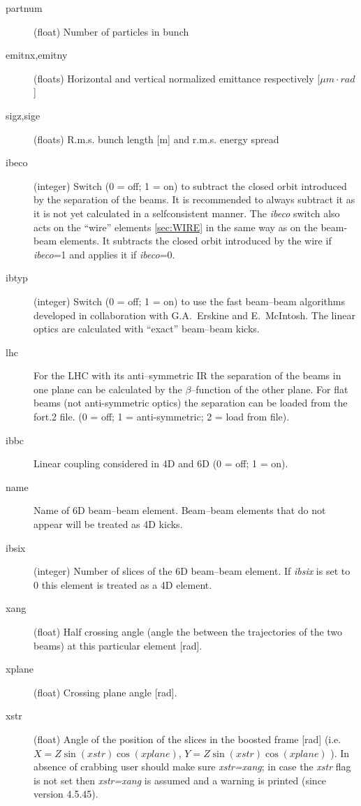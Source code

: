 \documentclass[a4paper,11pt]{report}
\begin{document}
\begin{description}
\item [partnum] (float) Number of particles in bunch
\item [emitnx,emitny] (floats) Horizontal and vertical normalized
  emittance respectively [$\mu m\cdot rad$]
\item [sigz,sige] (floats) R.m.s. bunch length [m] and r.m.s. energy
  spread
\item [ibeco] (integer) Switch (0 = off; 1 = on) to subtract the
  closed orbit introduced by the separation of the beams. It is
  recommended to always subtract it as it is not yet calculated in a
  selfconsistent manner. The \emph{ibeco} switch also acts on the ``wire'' elements \ref{sec:WIRE} in the same way as on the beam-beam elements. It subtracts the closed orbit introduced by the wire if \emph{ibeco}=1 and applies it if \emph{ibeco}=0.
\item [ibtyp] (integer) Switch (0 = off; 1 = on) to use the fast
  beam--beam algorithms developed in collaboration with G.A.~Erskine
  and E.~McIntosh.  The linear optics are calculated with ``exact''
  beam--beam kicks.
\item [lhc] For the LHC with its anti--symmetric IR the separation of
  the beams in one plane can be calculated by the $\beta$--function of
  the other plane. For flat beams (not anti-symmetric optics) the separation
  can be loaded from the fort.2 file. (0 = off; 1 = anti-symmetric; 2 = load from file).
\item [ibbc] Linear coupling considered in 4D and 6D (0 = off; 1 = on).
\item [name] Name of 6D beam--beam element. Beam--beam elements that
  do not appear will be treated as 4D kicks.
\item [ibsix] (integer) Number of slices of the 6D beam--beam element.
  If {\it ibsix} is set to 0 this element is treated as a 4D element.
\item [xang] (float) Half crossing angle (angle the between the trajectories of the two beams) at this particular element [rad].
\item [xplane] (float) Crossing plane angle [rad].
\item [xstr] (float) Angle of the position of the slices in the boosted frame [rad] (i.e. $X = Z \sin(\mathit{xstr}) \cos(\mathit{xplane})$, $Y =Z \sin(\mathit{xstr}) \cos(\mathit{xplane})$ ).
  In absence of crabbing user should make sure \textit{xstr=xang}; in case the \textit{xstr} flag is not set then \textit{xstr=xang} is assumed and a warning is printed (since version 4.5.45).
\end{description}
\end{document}

